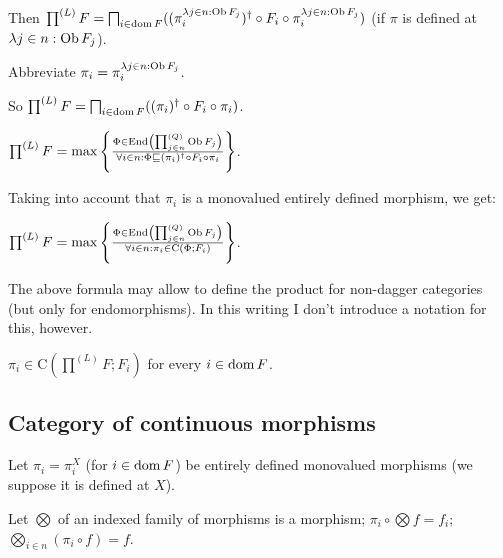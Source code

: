 Then $\prod^{(L)} F = \bigsqcap_{i \in \operatorname{dom} F} ((\pi^{\lambda j \in n :
\operatorname{Ob} F_j}_i)^{\dagger} \circ F_i \circ \pi^{\lambda j \in n : \operatorname{Ob}
F_j}_i)$ (if $\pi$ is defined at $\lambda j \in n : \operatorname{Ob} F_j$).

Abbreviate $\pi_i = \pi^{\lambda j \in n : \operatorname{Ob} F_j}_i$.

So $\prod^{(L)} F = \bigsqcap_{i \in \operatorname{dom} F} ((\pi_i)^{\dagger} \circ
F_i \circ \pi_i)$.

$\prod^{(L)} F = \max \left\{ \frac{ \Phi \in \operatorname{End} \left( \prod^{(Q)}_{j \in n}
\operatorname{Ob} F_j \right) }{ \forall i \in n : \Phi
\sqsubseteq (\pi_i)^{\dagger} \circ F_i \circ \pi_i }\right\}$.

Taking into account that $\pi_i$ is a monovalued entirely defined morphism, we
get:

\begin{obvious}
$\prod^{(L)} F = \max \left\{ \frac{ \Phi \in \operatorname{End} \left( \prod^{(Q)}_{j \in
n} \operatorname{Ob} F_j \right) }{ \forall i \in n : \pi_i
\in \mathrm{C} (\Phi ; F_i) }\right\}$.
\end{obvious}

\begin{rem}
  The above formula may allow to define the product for non-dagger categories
  (but only for endomorphisms). In this writing I don't introduce a notation
  for this, however.
\end{rem}

\begin{cor}
  $\pi_i \in \mathrm{C} \left( \prod^{(L)} F ; F_i \right)$ for every $i \in
  \operatorname{dom} F$.
\end{cor}

\subsection{Category of continuous morphisms}

Let $\pi_i = \pi_i^X$ (for $i \in \operatorname{dom} F$) be entirely defined
monovalued morphisms (we suppose it is defined at $X$).

Let $\bigotimes$ of an indexed family of morphisms is a morphism; $\pi_i \circ
\bigotimes f = f_i$; $\bigotimes_{i \in n} (\pi_i \circ f) = f$.

